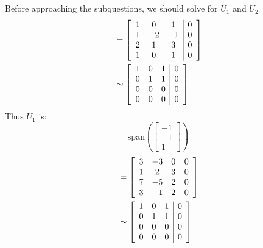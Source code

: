 \documentclass[12pt]{article}
\begin{document}
        \subsection{}
            Before approaching the subquestions, we should solve for $U_1$ and $U_2$
            \begin{align*}
                [A_1 | \vec{0}] &= \left[\begin{array}{c c c | c}
                    1 & 0 & 1 & 0\\
                    1 & -2 & -1 & 0\\
                    2 & 1 & 3 & 0\\
                    1 & 0 & 1 & 0
                    \end{array}\right]\\
                    &\sim \left[\begin{array}{c c c | c}
                        1 & 0 & 1 & 0\\
                        0 & 1 & 1 & 0\\
                        0 & 0 & 0 & 0\\
                        0 & 0 & 0 & 0
                    \end{array}\right]
            \end{align*}
            Thus $U_1$ is:
            \begin{equation*}
                \text{span} \left(\left[\begin{matrix}
                    -1\\
                    -1\\
                    1
                \end{matrix}\right] \right)
            \end{equation*}
            \begin{align*}
                [A_2 | \vec{0}] &= \left[\begin{array}{c c c | c}
                    3 & -3 & 0 & 0\\
                    1 & 2 & 3 & 0\\
                    7 & -5 & 2 & 0\\
                    3 & -1 & 2 & 0
                    \end{array}\right]\\
                    &\sim \left[\begin{array}{c c c | c}
                        1 & 0 & 1 & 0\\
                        0 & 1 & 1 & 0\\
                        0 & 0 & 0 & 0\\
                        0 & 0 & 0 & 0
                    \end{array}\right]
            \end{align*}
\end{document}

